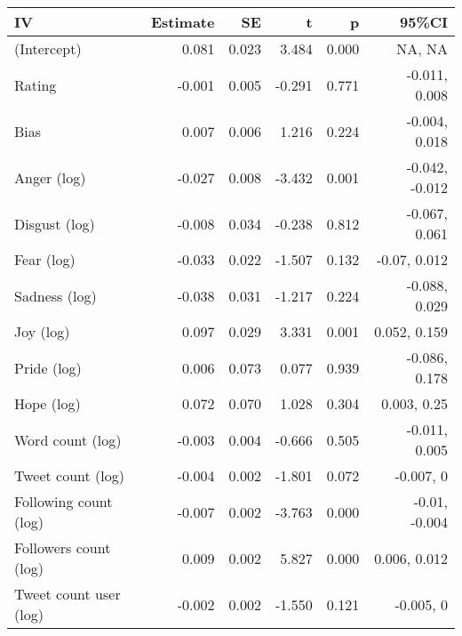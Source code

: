 
\begin{tabular}{lrrrrr}
\toprule
IV & Estimate & SE & t & p & 95\%CI\\
\midrule
(Intercept) & 0.081 & 0.023 & 3.484 & 0.000 & NA, NA\\
Rating & -0.001 & 0.005 & -0.291 & 0.771 & -0.011, 0.008\\
Bias & 0.007 & 0.006 & 1.216 & 0.224 & -0.004, 0.018\\
Anger (log) & -0.027 & 0.008 & -3.432 & 0.001 & -0.042, -0.012\\
Disgust (log) & -0.008 & 0.034 & -0.238 & 0.812 & -0.067, 0.061\\
Fear (log) & -0.033 & 0.022 & -1.507 & 0.132 & -0.07, 0.012\\
Sadness (log) & -0.038 & 0.031 & -1.217 & 0.224 & -0.088, 0.029\\
Joy (log) & 0.097 & 0.029 & 3.331 & 0.001 & 0.052, 0.159\\
Pride (log) & 0.006 & 0.073 & 0.077 & 0.939 & -0.086, 0.178\\
Hope (log) & 0.072 & 0.070 & 1.028 & 0.304 & 0.003, 0.25\\
Word count (log) & -0.003 & 0.004 & -0.666 & 0.505 & -0.011, 0.005\\
Tweet count (log) & -0.004 & 0.002 & -1.801 & 0.072 & -0.007, 0\\
Following count (log) & -0.007 & 0.002 & -3.763 & 0.000 & -0.01, -0.004\\
Followers count (log) & 0.009 & 0.002 & 5.827 & 0.000 & 0.006, 0.012\\
Tweet count user (log) & -0.002 & 0.002 & -1.550 & 0.121 & -0.005, 0\\
\bottomrule
\end{tabular}

